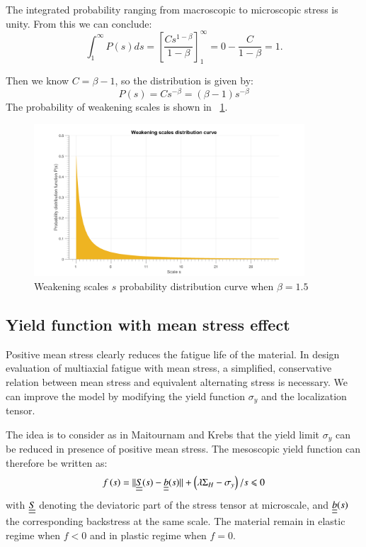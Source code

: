 \documentclass[3p,times,number,review]{elsarticle}
\newcommand{\figref}[1]{\figurename~\ref{#1}}
\begin{document}
The integrated probability ranging from macroscopic to microscopic stress  is unity. From this we can conclude:
$$\int_{1}^{\infty}P(s)ds=\left[ \frac{Cs^{1-\beta}}{1-\beta}\right] _{1}^{\infty}=0-\frac{C}{1-\beta}=1.$$


Then we know $C=\beta-1$, so the distribution is given by:
$$P(s) = Cs^{-\beta}=(\beta-1)s^{-\beta}$$
The probability of weakening scales is shown in \figref{ps}.
\begin{figure}[!h]
	\centering
	\includegraphics[width=0.9\textwidth]{figures//ps.png} 
	\caption{Weakening scales $s$ probability distribution curve when $\beta=1.5$ }
	\label{ps}
\end{figure}


\subsection{Yield function with mean stress effect}

Positive mean stress clearly reduces the fatigue life of the material. In design evaluation of multiaxial fatigue with mean stress, a simplified, conservative relation between mean stress and equivalent alternating stress is necessary. We can improve the model by modifying the yield function $\sigma_y$ and the localization tensor.

The idea is to consider as in Maitournam and Krebs\cite{Maitournam2011232} that the yield limit $\sigma_y$ can be reduced in presence of positive mean stress. The mesoscopic yield function can therefore be written as:
\begin{equation}
f\left(s\right)=||\uline{\uline{S}}(s)-\uline{\uline{b}}(s)||+\left( \lambda \Sigma_H-\sigma_y\right) /s\leqslant 0
\label{yieldfun}
\end{equation}
with $\uline{\uline{S}}$ denoting the deviatoric part of the stress tensor at microscale, and $\uline{\uline{b}}(s)$ the corresponding backstress at the same scale. The material remain in elastic regime when $f<0$ and in plastic regime when $f=0$.
\end{document}
